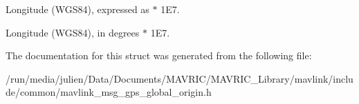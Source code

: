 Longitude (W\+G\+S84), expressed as $\ast$ 1\+E7. 

Longitude (W\+G\+S84), in degrees $\ast$ 1\+E7. 

The documentation for this struct was generated from the following file\+:\begin{DoxyCompactItemize}
\item 
/run/media/julien/\+Data/\+Documents/\+M\+A\+V\+R\+I\+C/\+M\+A\+V\+R\+I\+C\+\_\+\+Library/mavlink/include/common/mavlink\+\_\+msg\+\_\+gps\+\_\+global\+\_\+origin.\+h\end{DoxyCompactItemize}
